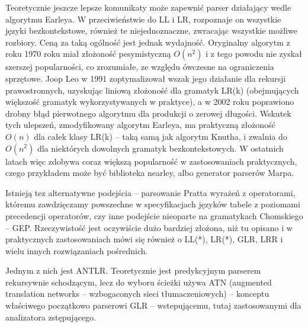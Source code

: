 Teoretycznie jeszcze lepsze komunikaty może zapewnić parser działający wedle algorytmu Earleya\cite{EARLEY_1970}. W przeciwieństwie do LL i LR, rozpoznaje on wszystkie języki bezkontekstowe, również te niejednoznaczne, zwracając wszystkie możliwe rozbiory. Ceną za taką ogólność jest jednak wydajność. Oryginalny algorytm z roku 1970 roku miał złożoność pesymistyczną $O(n^2)$ i z tego powodu nie zyskał szerszej popularności, co zrozumiałe, ze względu ówczesne na ograniczenia sprzętowe. Joop Leo w 1991 zoptymalizował wszak jego działanie dla rekursji prawostronnych, uzyskując liniową złożoność dla gramatyk LR(k)\cite{JOOP_LEO_1991} (obejmujących większość gramatyk wykorzystywanych w praktyce\cite{parsing_timeline_kegler}), a w 2002 roku poprawiono drobny błąd pierwotnego algorytmu dla produkcji o zerowej długości\cite{AYCOCK_HORSPOOL_NIGEL_2002}. Wskutek tych ulepszeń, zmodyfikowany algorytm Earleya, ma praktyczną złożoność $O(n)$ dla całek klasy LR(k) – taką samą jak algorytm Knutha, i zwalnia do $O(n^2)$ dla niektórych dowolnych gramatyk bezkontekstowych.\cite{what_is_marpa_algorithm} W ostatnich latach więc zdobywa coraz większą popularność w zastosowaniach praktycznych, czego przykładem może być biblioteka nearley\cite{nearley}, albo generator parserów Marpa\cite{marpa_paper}\cite{marpa_page}.

Istnieją tez alternatywne podejścia – parsowanie Pratta wyrażeń z operatorami, któremu zawdzięczamy powszechne w specyfikacjach języków tabele z poziomami precedencji operatorów, czy inne podejście nieoparte na gramatykach Chomskiego – GEP. Rzeczywistość jest oczywiście dużo bardziej złożona, niż tu opisano i w praktycznych zastosowaniach mówi się również o LL(*), LR(*), GLR, LRR i wielu innych rozwiązaniach pośrednich.

Jednym z nich jest ANTLR. Teoretycznie jest predykcyjnym parserem rekursywnie schodzącym, lecz do wyboru ścieżki używa ATN (augmented translation networks – wzbogaconych sieci tłumaczeniowych) – konceptu właściwego początkowo parserowi GLR – wstepującemu, tutaj zastosowanymi dla analizatora zstępującego.\cite{PARR_2014}

